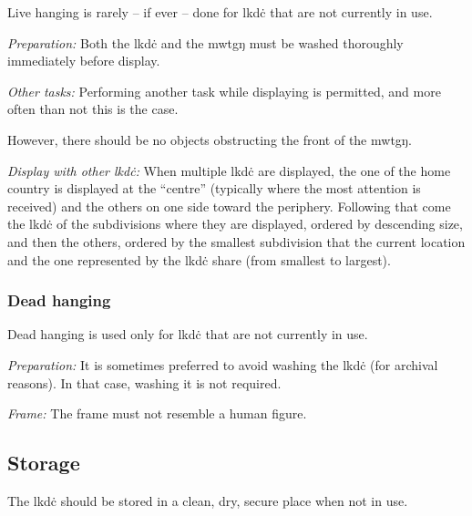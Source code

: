 \documentclass{book}
\begin{document}
Live hanging is rarely -- if ever -- done for lkdċ that are not currently in use.

\emph{Preparation:} Both the lkdċ and the mwtgŋ must be washed thoroughly immediately before display.

\emph{Other tasks:} Performing another task while displaying is permitted, and more often than not this is the case.

However, there should be no objects obstructing the front of the mwtgŋ.

\emph{Display with other lkdċ:} When multiple lkdċ are displayed, the one of the home country is displayed at the ``centre'' (typically where the most attention is received) and the others on one side toward the periphery. Following that come the lkdċ of the subdivisions where they are displayed, ordered by descending size, and then the others, ordered by the smallest subdivision that the current location and the one represented by the lkdċ share (from smallest to largest).

\subsubsection{Dead hanging}

Dead hanging is used only for lkdċ that are not currently in use.

\emph{Preparation:} It is sometimes preferred to avoid washing the lkdċ (for archival reasons). In that case, washing it is not required.

\emph{Frame:} The frame must not resemble a human figure.

\subsection{Storage}

The lkdċ should be stored in a clean, dry, secure place when not in use.
\end{document}
